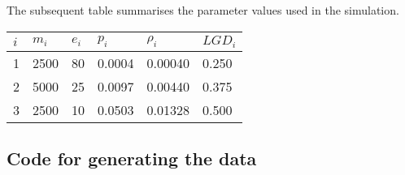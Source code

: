 \documentclass[]{article}
\begin{document}
The subsequent table summarises the parameter values used in the simulation.

\begin{longtable}[]{@{}llllll@{}}
\toprule
\(i\) & \(m_i\) & \(e_i\) & \(p_i\) & \(\rho_i\) & \(LGD_i\)\tabularnewline
\midrule
\endhead
1 & 2500 & 80 & 0.0004 & 0.00040 & 0.250\tabularnewline
2 & 5000 & 25 & 0.0097 & 0.00440 & 0.375\tabularnewline
3 & 2500 & 10 & 0.0503 & 0.01328 & 0.500\tabularnewline
\bottomrule
\end{longtable}

\hypertarget{code-for-generating-the-data}{%
\subsection{Code for generating the data}\label{code-for-generating-the-data}}
\end{document}
